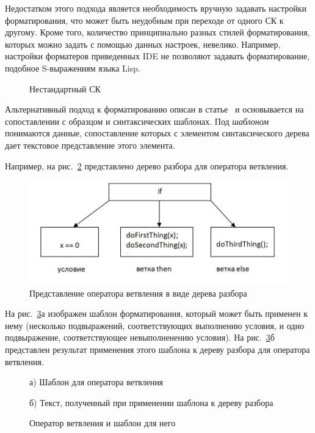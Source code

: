 \documentclass[conference]{IEEEtran}
\begin{document}
Недостатком этого подхода является необходимость вручную задавать настройки форматирования, что может быть неудобным при переходе от одного СК к другому.
Кроме того, количество принципиально разных стилей форматирования, которых можно задать с помощью данных настроек, невелико.
Например, настройки форматеров приведенных IDE не позволяют задавать форматирование, подобное S-выражениям языка Lisp.
\begin{figure}[h]
	\centering
	
	\caption{Нестандартный СК}
	\label{fig:unusualCC}
\end{figure}

Альтернативный подход к форматированию описан в статье~\cite{while} и основывается на сопоставлении с образцом и синтаксических шаблонах.
Под \emph{шаблоном} понимаются данные, сопоставление которых с элементом синтаксического дерева дает текстовое представление этого элемента.

Например, на рис.~\ref{fig:ifTree} представлено дерево разбора для оператора ветвления. 
\begin{figure}[h]
	\centering
	\includegraphics[width=.5\textwidth]{images/ifTree.jpg}
	\caption{Представление оператора ветвления в виде дерева разбора}
	\label{fig:ifTree}
\end{figure}

На рис.~\ref{fig:tmpltcodeintro}а изображен шаблон форматирования, который может быть применен к нему (несколько подвыражений, соответствующих выполнению условия, и одно подвыражение, соответствующее невыполненению условия).
На рис.~\ref{fig:tmpltcodeintro}б представлен результат применения этого шаблона к дереву разбора для оператора ветвления.

\begin{figure}[ht]
\noindent\begin{minipage}{.2\textwidth}
    
\caption*{а) Шаблон для оператора ветвления}    
\end{minipage}\hfill
\begin{minipage}{.25\textwidth}
    
\caption*{б) Текст, полученный при применении шаблона к дереву разбора}    
\end{minipage}
\caption{Оператор ветвления и шаблон для него}    
\label{fig:tmpltcodeintro}
\end{figure}
\end{document}

